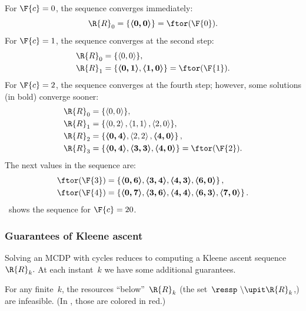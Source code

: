 \noindent For $\F{c}=0$, the sequence converges immediately: 
\[
\R{R}_{0}=\{\boldsymbol{\left\langle 0,0\right\rangle }\}=\ftor(\F{0}).
\]
 For $\F{c}=1$, the sequence converges at the second step:
\begin{align*}
\R{R}_{0} & =\{\left\langle 0,0\right\rangle \},\\
\R{R}_{1} & =\{\boldsymbol{\left\langle 0,1\right\rangle },\boldsymbol{\left\langle 1,0\right\rangle }\}=\ftor(\F{1}).
\end{align*}
For $\F{c}=2$, the sequence converges at the fourth step; however,
some solutions (in bold) converge sooner:
\begin{align*}
\R{R}_{0} & =\{\left\langle 0,0\right\rangle \},\\
\R{R}_{1} & =\{\left\langle 0,2\right\rangle ,\left\langle 1,1\right\rangle ,\left\langle 2,0\right\rangle \},\\
\R{R}_{2} & =\left\{ \boldsymbol{\left\langle 0,4\right\rangle },\left\langle 2,2\right\rangle ,\boldsymbol{\left\langle 4,0\right\rangle }\right\} ,\\
\R{R}_{3} & =\{\boldsymbol{\left\langle 0,4\right\rangle },\boldsymbol{\left\langle 3,3\right\rangle },\boldsymbol{\left\langle 4,0\right\rangle }\}=\ftor(\F{2}).
\end{align*}
The next values in the sequence are:
\begin{align*}
\ftor(\F{3}) & =\left\{ \boldsymbol{\left\langle 0,6\right\rangle },\boldsymbol{\left\langle 3,4\right\rangle },\boldsymbol{\left\langle 4,3\right\rangle },\boldsymbol{\left\langle 6,0\right\rangle }\right\} ,\\
\ftor(\F{4}) & =\left\{ \boldsymbol{\left\langle 0,7\right\rangle },\boldsymbol{\left\langle 3,6\right\rangle },\boldsymbol{\left\langle 4,4\right\rangle },\boldsymbol{\left\langle 6,3\right\rangle },\boldsymbol{\left\langle 7,0\right\rangle }\right\} .
\end{align*}
~shows the sequence for $\F{c}=20$.

\subsubsection*{Guarantees of Kleene ascent}

\noindent Solving an MCDP with cycles reduces to computing a Kleene
ascent sequence~$\R{R}_{k}.$ At each instant~$k$ we have some
additional guarantees. 

For any finite~$k$, the resources ``below''~$\R{R}_{k}$ (the
set~$\ressp\ \backslash\upit\R{R}_{k}$,) are infeasible. (In ,
those are colored in red.) 

